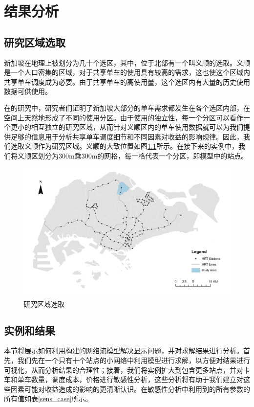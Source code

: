 \documentclass[]{tongjithesis}
\numberwithin{equation}{chapter}
\begin{document}
\chapter{结果分析}
\section{研究区域选取}
新加坡在地理上被划分为几十个选区，其中，位于北部有一个叫义顺的选取。义顺是一个人口密集的区域，对于共享单车的使用具有较高的需求，这也使这个区域内共享单车调度成为必要。由于共享单车的高使用量，这个选区内有大量的历史使用数据可供使用。

在\cite{shen2018mobility}的研究中，研究者们证明了新加坡大部分的单车需求都发生在各个选区内部，在空间上天然地形成了不同的使用分区。由于使用的独立性，每一个分区可以看作一个更小的相互独立的研究区域，从而针对义顺区内的单车使用数据就可以为我们提供足够的信息用于分析共享单车调度细节和不同因素对收益的影响规律。因此，我们选取义顺作为研究区域。义顺的大致位置如图\ref{yishun}所示。在接下来的实例中，我们将义顺区划分为300m乘300m的网格，每一格代表一个分区，即模型中的站点。

\begin{figure}[H]
	\centering
	\includegraphics[width= 0.9 \textwidth]{figures_main/location_yishun.png}
	\caption{研究区域选取}
	\label{yishun}
\end{figure}

\section{实例和结果}
本节将展示如何利用构建的网络流模型解决显示问题，并对求解结果进行分析。首先，我们先在一个只有十个站点的小网络中利用模型进行求解，以方便对结果进行可视化，从而分析结果的合理性；接着，我们将实例扩大到包含更多站点，并对卡车和单车数量，调度成本，价格进行敏感性分析，这些分析将有助于我们建立对这些因素可能对收益造成的影响的更清晰认识。在敏感性分析中利用到的所有参数的所有值如表\ref{sens_case}所示。
\end{document}
